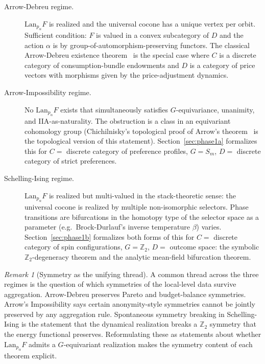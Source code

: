 \documentclass[11pt,a4paper]{article}
\theoremstyle{plain}
\theoremstyle{definition}
\theoremstyle{remark}
\newtheorem{remark}[theorem]{Remark}
\newcommand{\Lan}{\mathrm{Lan}}
\newcommand{\Sm}{S_{m}}
\newcommand{\Ztwo}{\mathbb{Z}_{2}}
\begin{document}
\begin{description}
  \item[Arrow-Debreu regime.] $\Lan_{p_\alpha} F$ is realized and the
        universal cocone has a unique vertex per orbit.  Sufficient
        condition: $F$ is valued in a convex subcategory of $D$ and the
        action $\alpha$ is by group-of-automorphism-preserving functors.
        The classical Arrow-Debreu existence theorem~\cite{arrow-debreu-1954}
        is the special case where $C$ is a discrete category of
        consumption-bundle endowments and $D$ is a category of price
        vectors with morphisms given by the price-adjustment dynamics.
  \item[Arrow-Impossibility regime.] No $\Lan_{p_\alpha} F$ exists that
        simultaneously satisfies $G$-equivariance, unanimity, and
        IIA-as-naturality.  The obstruction is a class in an equivariant
        cohomology group (Chichilnisky's topological proof of Arrow's
        theorem~\cite{chichilnisky-1980} is the topological version of
        this statement).  Section~\ref{sec:phase1a} formalizes this for
        $C =$ discrete category of preference profiles, $G = \Sm$,
        $D =$ discrete category of strict preferences.
  \item[Schelling-Ising regime.] $\Lan_{p_\alpha} F$ is realized but
        multi-valued in the stack-theoretic sense: the universal cocone
        is realized by multiple non-isomorphic selectors.  Phase
        transitions are bifurcations in the homotopy type of the
        selector space as a parameter (e.g.\ Brock-Durlauf's inverse
        temperature $\beta$) varies.  Section~\ref{sec:phase1b}
        formalizes both forms of this for $C =$ discrete category
        of spin configurations, $G = \Ztwo$, $D =$ outcome space:
        the symbolic $\Ztwo$-degeneracy theorem and the analytic
        mean-field bifurcation theorem.
\end{description}

\begin{remark}[Symmetry as the unifying thread]
A common thread across the three regimes is the question of which
symmetries of the local-level data survive aggregation.  Arrow-Debreu
preserves Pareto and budget-balance symmetries.  Arrow's Impossibility
says certain anonymity-style symmetries cannot be jointly preserved by
any aggregation rule.  Spontaneous symmetry breaking in Schelling-Ising
is the statement that the dynamical realization breaks a $\Ztwo$
symmetry that the energy functional preserves.  Reformulating these
as statements about whether $\Lan_{p_\alpha} F$ admits a $G$-equivariant
realization makes the symmetry content of each theorem explicit.
\end{remark}
\end{document}

